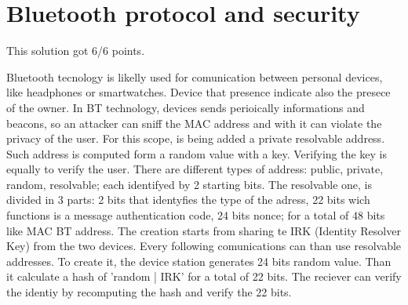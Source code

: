 \section{Bluetooth protocol and security}




\begin{solution}
    This solution got 6/6 points.
    
    Bluetooth tecnology is likelly used for comunication between personal devices, like headphones or smartwatches. Device that presence indicate also the presece of the owner. In BT technology, devices sends perioically informations and beacons, so an attacker can sniff the MAC address and with it can violate the privacy of the user. For this scope, is being added a private resolvable address. Such address is computed form a random value with a key. Verifying the key is equally to verify the user.
    There are different types of address: public, private, random, resolvable; each identifyed by 2 starting bits. The resolvable one, is divided in 3 parts: 2 bits that identyfies the type of the adress, 22 bits wich functions is a message authentication code, 24 bits nonce; for a total of 48 bits like MAC BT address.
    The creation starts from sharing te IRK (Identity Resolver Key) from the two devices. Every following comunications can than use resolvable addresses. To create it, the device station generates 24 bits random value. Than it calculate a hash of 'random | IRK' for a total of 22 bits. The reciever can verify the identiy by recomputing the hash and verify the 22 bits.
\end{solution}




